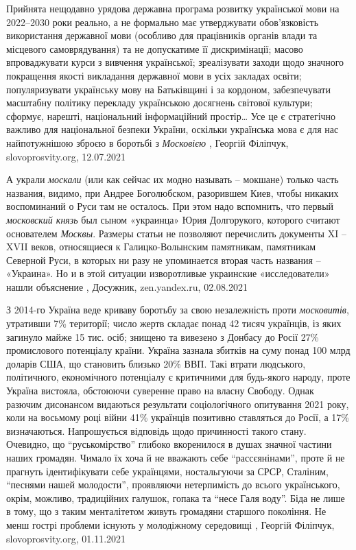 Прийнята нещодавно урядова державна програма розвитку української мови на
2022–2030 роки реально, а не формально має утверджувати обов’язковість
використання державної мови (особливо для працівників органів влади та
місцевого самоврядування) та не допускатиме її дискримінації; масово
впроваджувати курси з вивчення української; зреалізувати заходи щодо значного
покращення якості викладання державної мови в усіх закладах освіти;
популяризувати українську мову на Батьківщині і за кордоном, забезпечувати
масштабну політику перекладу українською досягнень світової культури; сформує,
нарешті, національний інформаційний простір… Усе це є стратегічно важливо для
національної безпеки України, оскільки українська мова є для нас найпотужнішою
зброєю в боротьбі з \emph{Московією}
, Георгій Філіпчук, slovoprosvity.org, 12.07.2021

А украли \emph{москали} (или как сейчас их модно называть – мокшане) только часть
названия, видимо, при Андрее Боголюбском, разорившем Киев, чтобы никаких
воспоминаний о Руси там не осталось. При этом надо вспомнить, что первый
\emph{московский князь} был сыном «украинца» Юрия Долгорукого, которого считают
основателем \emph{Москвы}.  Размеры статьи не позволяют перечислить документы XI –
XVII веков, относящиеся к Галицко-Волынским памятникам, памятникам Северной
Руси, в которых ни разу не упоминается вторая часть названия – «Украина». Но и
в этой ситуации изворотливые украинские «исследователи» нашли объяснение
, Досужник, zen.yandex.ru, 02.08.2021

З 2014-го Україна веде криваву боротьбу за свою незалежність проти \emph{московитів},
утративши 7\% території; число жертв складає понад 42 тисяч українців, із яких
загинуло майже 15 тис. осіб; знищено та вивезено з Донбасу до Росії 27\%
промислового потенціалу країни. Україна зазнала збитків на суму понад 100 млрд
доларів США, що становить близько 20\% ВВП.  Такі втрати людського, політичного,
економічного потенціалу є критичними для будь-якого народу, проте Україна
вистояла, обстоюючи суверенне право на власну Свободу.  Однак разючим
дисонансом видаються результати соціологічного опитування 2021 року, коли на
восьмому році війни 41\% українців позитивно ставляться до Росії, а 17\%
визначаються. Напрошується відповідь щодо причинності такого стану. Очевидно,
що \enquote{руськомірство} глибоко вкоренилося в душах значної частини наших громадян.
Чимало їх хоча й не вважають себе \enquote{рассєянінами}, проте й не прагнуть
ідентифікувати себе українцями, ностальгуючи за СРСР, Сталіним, \enquote{песнями нашей
молодости}, проявляючи нетерпимість до всього українського, окрім, можливо,
традиційних галушок, гопака та \enquote{несе Галя воду}. Біда не лише в тому, що з
таким менталітетом живуть громадяни старшого покоління. Не менш гострі проблеми
існують у молодіжному середовищі
, 
Георгій Філіпчук, slovoprosvity.org, 01.11.2021

